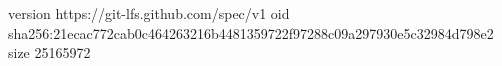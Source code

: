 version https://git-lfs.github.com/spec/v1
oid sha256:21ecac772cab0c464263216b4481359722f97288c09a297930e5c32984d798e2
size 25165972
